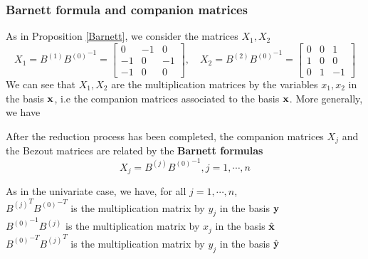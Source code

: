 \documentclass{standalone}
\begin{document}
\subsubsection{Barnett formula and companion matrices}
As in Proposition \ref{Barnett}, we consider the matrices $X_1, X_2$
\begin{equation}
	X_1 = B^{(1)}{B^{(0)}}^{-1} =
	\begin{bmatrix}
		0 & -1 & 0\\
		-1 & 0 & -1\\
		-1 & 0 & 0
	\end{bmatrix},\quad
	X_2 = B^{(2)}{B^{(0)}}^{-1} =
	\begin{bmatrix}
		0 & 0 & 1\\
		1 & 0 & 0\\
		0 & 1 & -1
	\end{bmatrix}
\end{equation}
We can see that $X_1, X_2$ are the multiplication matrices by the variables $x_1, x_2$ in the basis $\bold{x}$, i.e the companion matrices associated to the basis $\bold{x}$. More generally, we have
\begin{prop}
\label{Barnett_multi}
After the reduction process has been completed, the companion matrices $X_j$ and the Bezout matrices are related by the {\bf Barnett formulas}
\begin{equation}
	X_j = B^{(j)}{B^{(0)}}^{-1}, j = 1,\cdots, n
\end{equation}
\end{prop}

\begin{rem}
As in the univariate case, we have, for all $j=1,\cdots,n$,\\
${B^{(j)}}^{T}{B^{(0)}}^{-T}$ is the multiplication matrix by $y_j$ in the basis $\bold{y}$ \\
${B^{(0)}}^{-1}{B^{(j)}}$  is the multiplication matrix by $x_j$ in the basis $\hat{\bold{x}}$ \\
${B^{(0)}}^{-T}{B^{(j)}}^{T}$  is the multiplication matrix by $y_j$ in the basis $\hat{\bold{y}}$
\end{rem}
\end{document}
